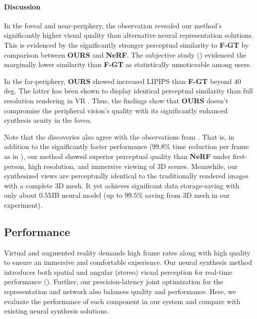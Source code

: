 \paragraph{Discussion}
In the foveal and near-periphery, the observation revealed our method's significantly higher visual quality than alternative neural representation solutions. This is evidenced by the significantly stronger perceptual similarity to \textbf{F-GT} by comparison between \textbf{OURS} and \textbf{NeRF}. The subjective study () evidenced the marginally lower similarity than \textbf{F-GT} as statistically unnoticeable among users.

In the far-periphery, \textbf{OURS} showed increased LIPIPS than \textbf{F-GT} beyond $40$ deg.
The latter has been shown to display identical perceptual similarity than full resolution rendering in VR \cite{Patney:2016:TFR}.
Thus, the findings show that \textbf{OURS} doesn't compromise the peripheral vision's quality with its significantly enhanced synthesis acuity in the fovea. 

Note that the discoveries also agree with the observations from . That is, in addition to the significantly faster performance  ($99.8\%$ time reduction per frame as in ), our method showed superior perceptual quality than \textbf{NeRF} under first-person, high resolution, and immersive viewing of 3D scenes. Meanwhile, our synthesized views are perceptually identical to the traditionally rendered images with a complete 3D mesh. It yet achieves significant data storage-saving with only about $0.5$MB neural model (up to $99.5\%$ saving from 3D mesh in our experiment).

\subsection{Performance}
\label{sec:study:intra}
Virtual and augmented reality demands high frame rates along with high quality to ensure an immersive and comfortable experience. Our neural synthesis method introduces both spatial and angular (stereo) visual perception for real-time performance (). 
Further, our precision-latency joint optimization for the representation and network also balances quality and performance.
Here, we evaluate the performance of each component in our system and compare with existing neural synthesis solutions.

